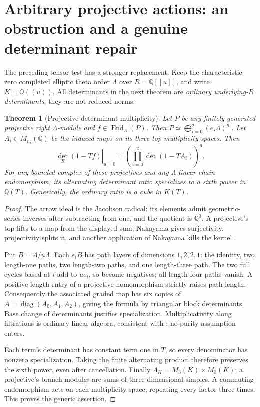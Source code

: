 \documentclass[11pt,oneside,openany]{book}
\newtheorem{theorem}{Theorem}[chapter]
\theoremstyle{definition}\newtheorem{definition}[theorem]{Definition}
\theoremstyle{remark}\newtheorem{remark}[theorem]{Remark}
\begin{document}
\section{Arbitrary projective actions: an obstruction and a genuine determinant repair}
The preceding tensor test has a stronger replacement. Keep the characteristic-zero completed elliptic theta order $\Lambda$ over $R=\mathbb Q[[u]]$, and write $K=\mathbb Q((u))$. All determinants in the next theorem are \emph{ordinary underlying-$R$ determinants}; they are not reduced norms.
\begin{theorem}[Projective determinant multiplicity]\label{thm:theta-multiplicity}
Let $P$ be any finitely generated projective right $\Lambda$-module and $f\in\operatorname{End}_\Lambda(P)$. Then $P\simeq\bigoplus_{i=0}^2(e_i\Lambda)^{n_i}$. Let $A_i\in M_{n_i}(\mathbb Q)$ be the induced maps on its three top multiplicity spaces. Then
\[
 \left.\det_R(1-Tf)\right|_{u=0}
 =\left(\prod_{i=0}^2\det(1-TA_i)\right)^6.
\]
For any bounded complex of these projectives and any $\Lambda$-linear chain endomorphism, its alternating determinant ratio specializes to a sixth power in $\mathbb Q(T)$. Generically, the ordinary ratio is a cube in $K(T)$.
\end{theorem}
\begin{proof}
The arrow ideal is the Jacobson radical: its elements admit geometric-series inverses after subtracting from one, and the quotient is $\mathbb Q^3$. A projective's top lifts to a map from the displayed sum; Nakayama gives surjectivity, projectivity splits it, and another application of Nakayama kills the kernel.

Put $B=\Lambda/u\Lambda$. Each $e_iB$ has path layers of dimensions $1,2,2,1$: the identity, two length-one paths, two length-two paths, and one length-three path. The two full cycles based at $i$ add to $ue_i$, so become negatives; all length-four paths vanish. A positive-length entry of a projective homomorphism strictly raises path length. Consequently the associated graded map has six copies of $A=\operatorname{diag}(A_0,A_1,A_2)$, giving the formula by triangular block determinants. Base change of determinants justifies specialization. Multiplicativity along filtrations is ordinary linear algebra, consistent with \cite[Tags0FJ9,0GSX]{StacksDeterminants}; no purity assumption enters.

Each term's determinant has constant term one in $T$, so every denominator has nonzero specialization. Taking the finite alternating product therefore preserves the sixth power, even after cancellation. Finally $\Lambda_K=M_3(K)\times M_3(K)$; a projective's branch modules are sums of three-dimensional simples. A commuting endomorphism acts on each multiplicity space, repeating every factor three times. This proves the generic assertion.
\end{proof}
\end{document}
